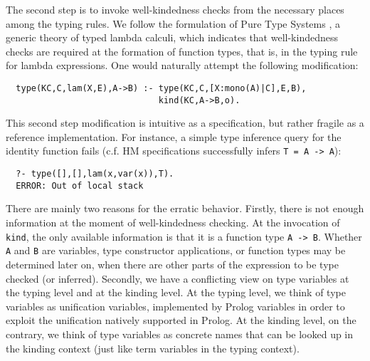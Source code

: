\documentclass[runningheads,a4paper]{llncs}
\begin{document}
The second step is to invoke well-kindedness checks from the necessary
places among the typing rules. We follow the formulation of Pure Type
Systems \cite{Barendregt91}, a generic theory of typed lambda calculi,
which indicates that well-kindedness checks are required at the
formation of function types, that is, in the typing rule for lambda
expressions. One would naturally attempt the following modification:%
{\small\vspace*{-1ex}
\begin{verbatim}
  type(KC,C,lam(X,E),A->B) :- type(KC,C,[X:mono(A)|C],E,B),
                              kind(KC,A->B,o).
\end{verbatim} \vspace*{-.7ex} }\noindent
This second step modification is intuitive as a specification, but
rather fragile as a reference implementation. For instance,
a simple type inference query for the identity function fails
(c.f. HM specifications successfully infers \verb|T = A -> A|):{\small \vspace*{-1ex}
\begin{verbatim}
  ?- type([],[],lam(x,var(x)),T).
  ERROR: Out of local stack
\end{verbatim} \vspace*{-.7ex} }

There are mainly two reasons for the erratic behavior.
Firstly, there is not enough information at the moment of
well-kindedness checking. At the invocation of \verb|kind|,
the only available information is that it is a function type \verb|A -> B|.
Whether \verb|A| and \verb|B| are variables, type constructor applications,
or function types may be determined later on, when there are other parts
of the expression to be type checked (or inferred). Secondly, we have
a conflicting view on type variables at the typing level and
at the kinding level. At the typing level, we think of type variables as
unification variables, implemented by Prolog variables in order to exploit
the unification natively supported in Prolog. At the kinding level,
on the contrary, we think of type variables as concrete names that
can be looked up in the kinding context (just like term variables
in the typing context).
\end{document}
